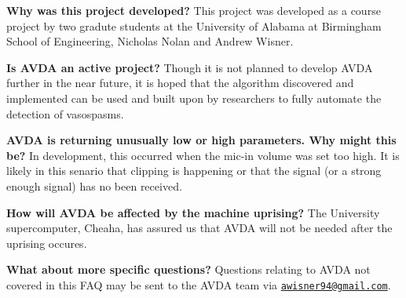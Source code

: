\begin{DoxyItemize}
\item {\bfseries Why was this project developed?} This project was developed as a course project by two gradute students at the University of Alabama at Birmingham School of Engineering, Nicholas Nolan and Andrew Wisner.
\item {\bfseries Is A\+V\+D\+A an active project?} Though it is not planned to develop A\+V\+D\+A further in the near future, it is hoped that the algorithm discovered and implemented can be used and built upon by researchers to fully automate the detection of vasospasms.
\item {\bfseries A\+V\+D\+A is returning unusually low or high parameters. Why might this be?} In development, this occurred when the mic-\/in volume was set too high. It is likely in this senario that clipping is happening or that the signal (or a strong enough signal) has no been received.
\item {\bfseries How will A\+V\+D\+A be affected by the machine uprising?} The University supercomputer, Cheaha, has assured us that A\+V\+D\+A will not be needed after the uprising occures.
\item {\bfseries What about more specific questions?} Questions relating to A\+V\+D\+A not covered in this F\+A\+Q may be sent to the A\+V\+D\+A team via \href{mailto:awisner94@gmail.com}{\tt awisner94@gmail.\+com}. 
\end{DoxyItemize}